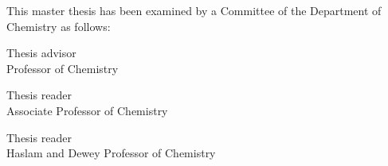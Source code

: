 %

\begin{titlepage}
\begin{large}
This master thesis has been examined by a Committee of the Department
of Chemistry as follows:

\signature{Professor Tod Machover}{Thesis advisor \\
   Professor of Chemistry}

\signature{Professor Zach Lieberman}{Thesis reader \\
   Associate Professor of Chemistry}

\signature{Professor Mitchel Resnick}{Thesis reader \\
   Haslam and Dewey Professor of Chemistry}
\end{large}
\end{titlepage}
